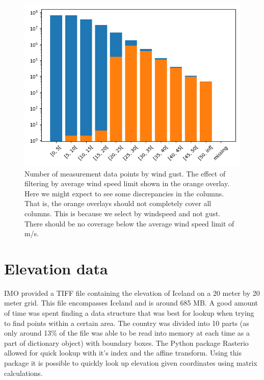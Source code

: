 \begin{figure}
    \centering
    \includegraphics[scale = 0.75]{Figures/measurements_by_windgust.png}
    \caption[Number of measurement data points by wind gust.]{Number of measurement data points by wind gust. The effect of filtering by average wind speed limit shown in the orange overlay. Here we might expect to see some discrepancies in the columns. That is, the orange overlays should not completely cover all columns. This is because we select by windspeed and not gust. There should be no coverage below the average wind speed limit of \averageWindSpeedLimit m/s.}
    \label{fig:measurements_by_windgust}
\end{figure}


\section{Elevation data}
IMO provided a TIFF file containing the elevation of Iceland on a 20 meter by 20 meter grid. This file encompasses Iceland and is around 685 MB. A good amount of time was spent finding a data structure that was best for lookup when trying to find points within a certain area. The country was divided into 10 parts (as only around 13\% of the file was able to be read into memory at each time as a part of dictionary object) with boundary boxes. The Python package Rasterio allowed for quick lookup with it's index and the affine transform. Using this package it is possible to quickly look up elevation given coordinates using matrix calculations.